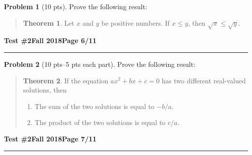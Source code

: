 \documentclass[11pt]{article}
\theoremstyle{definition}
\newtheorem{problem}{Problem}
\theoremstyle{theorem}
\newtheorem*{theorem}{Theorem}
\begin{document}
\bigskip
\begin{problem}[10 pts]
  Prove the following result:
  \vspace{-0.75cm}
  \begin{quotation}
    \begin{theorem}
      Let $x$ and $y$ be positive numbers.  If $x \leq y$, then $\sqrt{x} \leq \sqrt{y}$.
    \end{theorem}
  \end{quotation}
\end{problem}
\newpage

\hfill{\large\bf Test \#2}\hfill{\large\bf Fall 2018}\hfill{\large\bf Page 6/11}\hrule

\bigskip
\begin{problem}[10 pts--5 pts each part]
  Prove the following result:
  \vspace{-0.75cm}
  \begin{quotation}
    \begin{theorem}
      If the equation $ax^2+bx+c=0$ has two different real-valued solutions, then
      \begin{enumerate}
      \item The sum of the two solutions is equal to $-b/a$.
      \item The product of the two solutions is equal to $c/a$.
      \end{enumerate}
    \end{theorem}
  \end{quotation}
\end{problem}
\newpage

\hfill{\large\bf Test \#2}\hfill{\large\bf Fall 2018}\hfill{\large\bf Page 7/11}\hrule
\end{document}
